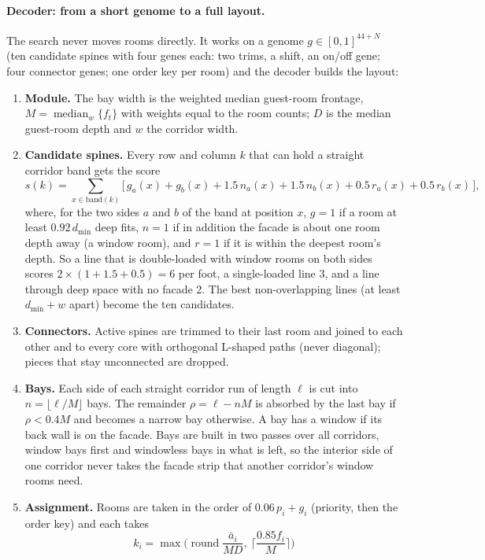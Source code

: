 \documentclass[10pt]{article}
\begin{document}
\paragraph{Decoder: from a short genome to a full layout.} The search never moves rooms directly. It works on a genome
$g \in [0,1]^{44+N}$ (ten candidate spines with four genes each: two trims, a shift, an on/off gene; four connector genes;
one order key per room) and the decoder builds the layout:
\begin{enumerate}
\item \textbf{Module.} The bay width is the weighted median guest-room frontage,
$M = \operatorname{median}_w\{f_t\}$ with weights equal to the room counts; $D$ is the median guest-room depth and $w$ the
corridor width.
\item \textbf{Candidate spines.} Every row and column $k$ that can hold a straight corridor band gets the score
\[ s(k) = \sum_{x \in \text{band}(k)} \big[\, g_a(x) + g_b(x) + 1.5\,n_a(x) + 1.5\,n_b(x) + 0.5\,r_a(x) + 0.5\,r_b(x) \,\big], \]
where, for the two sides $a$ and $b$ of the band at position $x$, $g=1$ if a room at least $0.92\,d_{\min}$ deep fits,
$n=1$ if in addition the facade is about one room depth away (a window room), and $r=1$ if it is within the deepest room's
depth. So a line that is double-loaded with window rooms on both sides scores $2 \times (1 + 1.5 + 0.5) = 6$ per foot, a
single-loaded line 3, and a line through deep space with no facade 2. The best non-overlapping lines (at least $d_{\min}+w$
apart) become the ten candidates.
\item \textbf{Connectors.} Active spines are trimmed to their last room and joined to each other and to every core with
orthogonal L-shaped paths (never diagonal); pieces that stay unconnected are dropped.
\item \textbf{Bays.} Each side of each straight corridor run of length $\ell$ is cut into
$n = \lfloor \ell / M \rfloor$ bays. The remainder $\rho = \ell - nM$ is absorbed by the last bay if $\rho < 0.4M$ and becomes
a narrow bay otherwise. A bay has a window if its back wall is on the facade. Bays are built in two passes over all
corridors, window bays first and windowless bays in what is left, so the interior side of one corridor never takes
the facade strip that another corridor's window rooms need.
\item \textbf{Assignment.} Rooms are taken in the order of $0.06\,p_i + g_i$ (priority, then the order key) and each takes
\[ k_i = \max\!\Big(\operatorname{round}\frac{\bar a_i}{M D},\ \Big\lceil \frac{0.85 f_i}{M} \Big\rceil\Big) \]

\end{enumerate}
\end{document}
